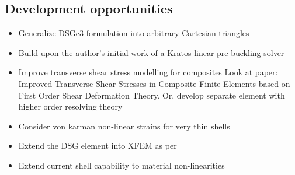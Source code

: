 \subsection{Development opportunities}
\begin{itemize}
	\item Generalize DSGc3 formulation into arbitrary Cartesian triangles
	\item Build upon the author's initial work of a Kratos linear pre-buckling solver
	\item Improve transverse shear stress modelling for composites
	Look at paper: Improved Transverse Shear Stresses in Composite Finite Elements based on First Order Shear Deformation Theory. Or, develop separate element with higher order resolving theory
	\item Consider von karman non-linear strains for very thin shells
	\item Extend the DSG element into XFEM as per \cite{DSG_XFEM_2015}
	\item Extend current shell capability to material non-linearities
\end{itemize}


